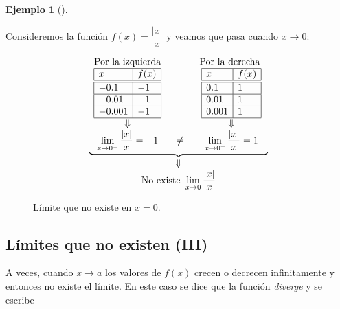 \documentclass[
  a4paper,
]{scrreport}
\theoremstyle{definition}
\theoremstyle{definition}
\newtheorem{example}{Ejemplo}[chapter]
\theoremstyle{definition}
\theoremstyle{plain}
\theoremstyle{plain}
\theoremstyle{plain}
\theoremstyle{remark}
\begin{document}
\begin{example}[]\protect\hypertarget{exm-limites-no-existen-2}{}\label{exm-limites-no-existen-2}

Consideremos la función \(f(x)=\dfrac{\lvert x\rvert}{x}\) y veamos que
pasa cuando \(x\to 0\):

\[\begin{array}{c}
\underbrace{\begin{array}{ccc}
\mbox{Por la izquierda} & \qquad & \mbox{Por la derecha }\\
\begin{array}{|l|l|}
\hline
x      & f(x)   \\
\hline\hline
 -0.1   & -1       \\
\hline
 -0.01   & -1     \\
\hline
 -0.001  & -1   \\
\hline
\end{array}
& &
\begin{array}{|l|l|}
\hline
x      & f(x)   \\
\hline\hline
 0.1    & 1       \\
\hline
 0.01   & 1    \\
\hline
 0.001  & 1   \\
\hline
\end{array}\\
\Downarrow & & \Downarrow\\
\displaystyle \lim_{x\to 0^-}\frac{|x|}{x}=-1
&\neq &
\displaystyle \lim_{x\to 0^+}\frac{|x|}{x}=1
\end{array}}\\
\Downarrow\\
\displaystyle \mbox{No existe }\lim_{x\to 0}\frac{|x|}{x}
\end{array}
\]

\begin{figure}
\centering

\caption{Límite que no existe en \(x=0\).}
\end{figure}

\end{example}

\subsection{Límites que no existen
(III)}\label{luxedmites-que-no-existen-iii}

A veces, cuando \(x\to a\) los valores de \(f(x)\) crecen o decrecen
infinitamente y entonces no existe el límite. En este caso se dice que
la función \emph{diverge} y se escribe
\end{document}
